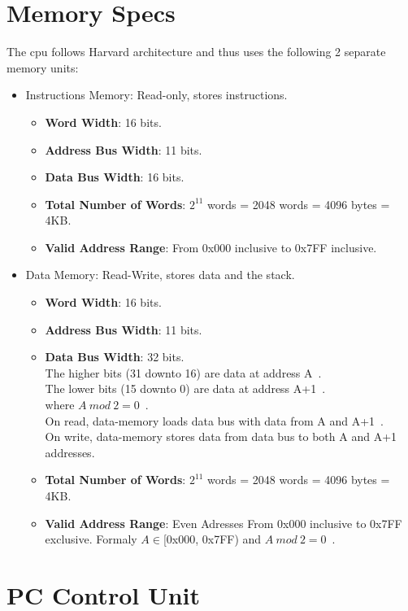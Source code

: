\section{Memory Specs}
The cpu follows Harvard architecture and thus uses the following 2 separate memory units:
\begin{itemize}
    \item Instructions Memory: Read-only, stores instructions.
    \begin{itemize}
        \item \textbf{Word Width}: 16 bits.
        \item \textbf{Address Bus Width}: 11 bits.
        \item \textbf{Data Bus Width}: 16 bits.
        \item \textbf{Total Number of Words}: $2^{11}$ words = 2048 words = 4096 bytes = 4KB.
        \item \textbf{Valid Address Range}: From 0x000 inclusive to 0x7FF inclusive.
    \end{itemize}
    \item Data Memory: Read-Write, stores data and the stack.
    \begin{itemize}
        \item \textbf{Word Width}: 16 bits.
        \item \textbf{Address Bus Width}: 11 bits.
        \item \textbf{Data Bus Width}: 32 bits.\\
        The higher bits (31 downto 16) are data at address A~.\\
        The lower bits (15 downto 0) are data at address A+1~.\\
        where $A ~mod~ 2 = 0$~.\\
        On read, data-memory loads data bus with data from A and A+1~.\\
        On write, data-memory stores data from data bus to both A and A+1 addresses.
        \item \textbf{Total Number of Words}: $2^{11}$ words = 2048 words = 4096 bytes = 4KB.
        \item \textbf{Valid Address Range}: Even Adresses From 0x000 inclusive to 0x7FF exclusive. Formaly $A \in $[0x000, 0x7FF) and $A ~mod~ 2 = 0$~.\\
    \end{itemize}
\end{itemize}

\section{PC Control Unit}

